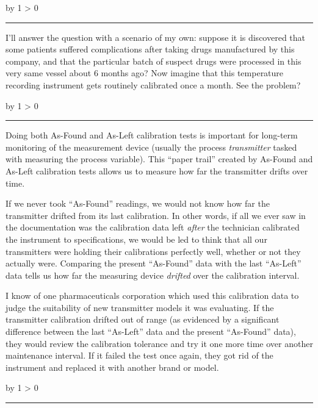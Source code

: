 \documentclass[12pt,a4paper]{article}
\def\oppgave{
            \advance\questnum by 1
            \ifnum \questnum > 0
                 \hrule
                 \vskip 3pt
                 \leftline{Oppgave \the\questnum}
                 \vskip 3pt \fi}
\def\svar{
           \advance\answnum by 1
           \ifnum \answnum > 0
                \hrule
                \vskip 3pt
                \leftline{Svar \the\answnum}
                \vskip 3pt \fi}
\def\notes{
           \advance\explnum by 1
           \ifnum \explnum > 0
                \hrule
                \vskip 3pt
                \leftline{Notes \the\explnum}
                \vskip 3pt \fi}
\begin{document}
\vskip 10pt \filbreak 





\svar{} 

I'll answer the question with a scenario of my own: suppose it is discovered that some patients suffered complications after taking drugs manufactured by this company, and that the particular batch of suspect drugs were processed in this very same vessel about 6 months ago?  Now imagine that this temperature recording instrument gets routinely calibrated once a month.  See the problem?

\vskip 10pt \filbreak 





\notes{} 

Doing both As-Found and As-Left calibration tests is important for long-term monitoring of the measurement device (usually the process {\it transmitter} tasked with measuring the process variable).  This ``paper trail'' created by As-Found and As-Left calibration tests allows us to measure how far the transmitter drifts over time.

If we never took ``As-Found'' readings, we would not know how far the transmitter drifted from its last calibration.  In other words, if all we ever saw in the documentation was the calibration data left {\it after} the technician calibrated the instrument to specifications, we would be led to think that all our transmitters were holding their calibrations perfectly well, whether or not they actually were.  Comparing the present ``As-Found'' data with the last ``As-Left'' data tells us how far the measuring device {\it drifted} over the calibration interval.

I know of one pharmaceuticals corporation which used this calibration data to judge the suitability of new transmitter models it was evaluating.  If the transmitter calibration drifted out of range (as evidenced by a significant difference between the last ``As-Left'' data and the present ``As-Found'' data), they would review the calibration tolerance and try it one more time over another maintenance interval.  If it failed the test once again, they got rid of the instrument and replaced it with another brand or model.


\vfil \eject 



\oppgave{} 
\end{document}
